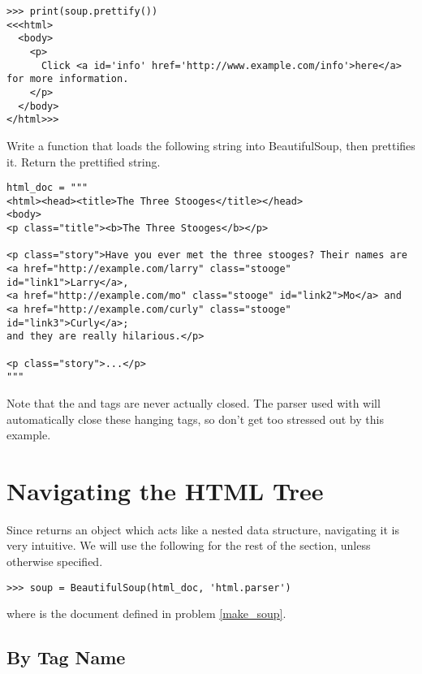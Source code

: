 \begin{lstlisting}
>>> print(soup.prettify())
<<<html>
  <body>
    <p>
      Click <a id='info' href='http://www.example.com/info'>here</a> for more information.
    </p>
  </body>
</html>>>
\end{lstlisting}

\begin{problem}\label{make_soup}
Write a function that loads the following string into BeautifulSoup, then prettifies it. Return the prettified string.
\begin{lstlisting}
html_doc = """
<html><head><title>The Three Stooges</title></head>
<body>
<p class="title"><b>The Three Stooges</b></p>

<p class="story">Have you ever met the three stooges? Their names are
<a href="http://example.com/larry" class="stooge" id="link1">Larry</a>,
<a href="http://example.com/mo" class="stooge" id="link2">Mo</a> and
<a href="http://example.com/curly" class="stooge" id="link3">Curly</a>;
and they are really hilarious.</p>

<p class="story">...</p>
"""
\end{lstlisting}

\begin{info}
Note that the  and  tags are never actually closed.
The parser used with  will automatically close these hanging tags, so don't get too stressed out by this example.
\end{info}

\end{problem}

\section*{Navigating the HTML Tree}

Since  returns an object which acts like a nested data structure, navigating it is very intuitive.
We will use the following for the rest of the section, unless otherwise specified.
\begin{lstlisting}
>>> soup = BeautifulSoup(html_doc, 'html.parser')
\end{lstlisting}
where  is the document defined in problem \ref{make_soup}.

\subsection*{By Tag Name}

